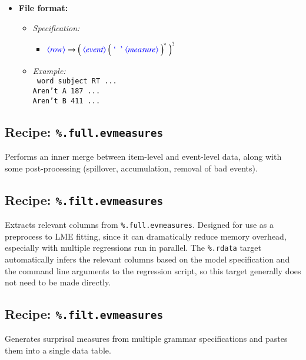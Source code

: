 \documentclass[12pt]{report}
\def\blue{\color{blue}}
\def\magenta{\color{magenta}}
\begin{document}
\begin{itemize}
      \item \textbf{File format:}
      \begin{itemize}
            \item \textit{Specification:}\\
            \begin{itemize}
                  \item $\dtype{row} \rightarrow \Big( \ \dtype{event} \ \Big( \ \dcode{\ } \ \dtype{measure} \ \Big)^* \ \Big)^?$
            \end{itemize}
            \item \textit{Example:}\\
            {\magenta\tt
            word subject RT ...\\
            Aren't A 187 ...\\
            Aren't B 411 ...\\
            }
      \end{itemize}
\end{itemize}

\subsection{Recipe: \blue\tt \%.full.evmeasures}
Performs an inner merge between item-level and event-level data, along with some post-processing (spillover, accumulation, removal of bad events).

\subsection{Recipe: \blue\tt \%.filt.evmeasures}
Extracts relevant columns from {\blue\tt \%.full.evmeasures}.
Designed for use as a preprocess to LME fitting, since it can dramatically reduce memory overhead, especially with multiple regressions run in parallel.
The {\blue\tt \%.rdata} target automatically infers the relevant columns based on the model specification and the command line arguments to the regression script, so this target generally does not need to be made directly.

\subsection{Recipe: \blue\tt \%.filt.evmeasures}
Generates surprisal measures from multiple grammar specifications and pastes them into a single data table.

\end{document}
